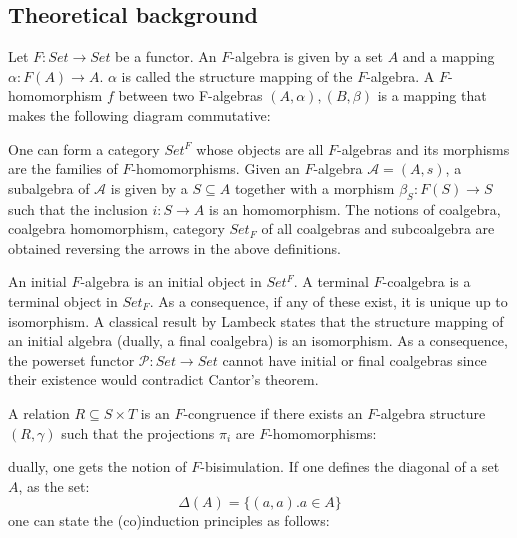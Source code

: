 \documentclass[notitlepage]{article}
\begin{document}
\subsection{Theoretical background}

Let $F: Set \to Set$ be a functor. An $F$-algebra is given by a set $A$ and a mapping $\alpha: F(A) \to A$. $\alpha$ is called the structure mapping of the $F$-algebra. A $F$-homomorphism $f$ between two F-algebras $(A,\alpha),(B,\beta)$ is a mapping that makes the following diagram commutative:


One can form a category $Set^F$ whose objects are all $F$-algebras and its morphisms are the families of $F$-homomorphisms. Given an $F$-algebra $\mathcal{A} = (A,s)$, a subalgebra of $\mathcal{A}$ is given by a $S \subseteq A$ together with a morphism $\beta_S:F(S) \to S$ such that the inclusion $i: S \to A$ is an homomorphism. The notions of coalgebra, coalgebra homomorphism, category $Set_F$ of all coalgebras and subcoalgebra are obtained reversing the arrows in the above definitions. 

An initial $F$-algebra is an initial object in $Set^F$. A terminal $F$-coalgebra is a terminal object in $Set_F$. As a consequence, if any of these exist, it is unique up to isomorphism. A classical result by Lambeck states that the structure mapping of an initial algebra (dually, a final coalgebra) is an isomorphism. As a consequence, the powerset functor $\mathcal{P}: Set \to Set$ cannot have initial or final coalgebras since their existence would contradict Cantor's theorem. 
	
A relation $R \subseteq S \times T$ is an $F$-congruence if there exists an $F$-algebra structure $(R,\gamma)$ such that the projections $\pi_i$ are $F$-homomorphisms:
	

dually, one gets the notion of $F$-bisimulation. If one defines the diagonal of a set $A$, as the set: \[\Delta(A) = \{(a,a). a \in A\}\] one can state the (co)induction principles as follows:
\end{document}
